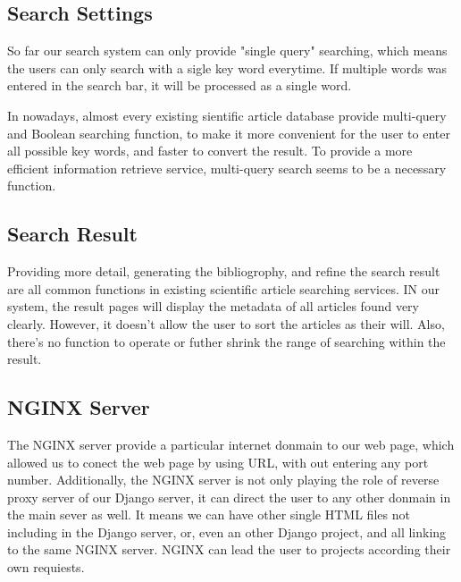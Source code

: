 \subsection{Search Settings}
So far our search system can only provide "single query" searching, which means the users can only search with a sigle key word everytime.
If multiple words was entered in the search bar, it will be processed as a single word.

In nowadays, almost every existing sientific article database provide multi-query and Boolean searching function,
to make it more convenient for the user to enter all possible key words,
and faster to convert the result.
To provide a more efficient information retrieve service,
multi-query search seems to be a necessary function.

\subsection{Search Result}
Providing more detail, generating the bibliogrophy, and refine the search result are all common functions in existing scientific article searching services.
IN our system, the result pages will display the metadata of all articles found very clearly.
However, it doesn't allow the user to sort the articles as their will. Also,
there's no function to operate or futher shrink the range of searching within the result.

\subsection{NGINX Server}
The NGINX server provide a particular internet donmain to our web page,
which allowed us to conect the web page by using URL,
with out entering any port number. Additionally,
the NGINX server is not only playing the role of reverse proxy server of our Django server,
it can direct the user to any other donmain in the main sever as well.
It means we can have other single HTML files not including in the Django server, or,
even an other Django project, and all linking to the same NGINX server.
NGINX can lead the user to projects according their own requiests. 